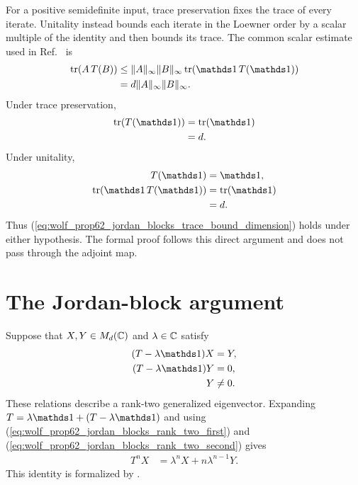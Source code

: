 \documentclass{article}
\begin{document}
For a positive semidefinite input, trace preservation fixes the trace of every
iterate. Unitality instead bounds each iterate in the Loewner order by a scalar
multiple of the identity and then bounds its trace. The common scalar estimate
used in Ref.~\cite{Wolf2012Quantum} is
\begin{align}
    \tr\!\left(A\,T(B)\right)
        &\leq \lVert A\rVert_\infty\lVert B\rVert_\infty
            \tr\!\left(\Id\,T(\Id)\right)
    \label{eq:wolf_prop62_jordan_blocks_trace_bound_first}\\
        &=d\lVert A\rVert_\infty\lVert B\rVert_\infty.
    \label{eq:wolf_prop62_jordan_blocks_trace_bound_dimension}
\end{align}
Under trace preservation,
\begin{align}
    \tr\!\left(T(\Id)\right)
        &=\tr(\Id)
    \label{eq:wolf_prop62_jordan_blocks_trace_preserving_identity}\\
        &=d.
    \label{eq:wolf_prop62_jordan_blocks_trace_preserving_dimension}
\end{align}
Under unitality,
\begin{align}
    T(\Id)&=\Id,
    \label{eq:wolf_prop62_jordan_blocks_unital_identity}\\
    \tr\!\left(\Id\,T(\Id)\right)
        &=\tr(\Id)
    \label{eq:wolf_prop62_jordan_blocks_unital_trace}\\
        &=d.
    \label{eq:wolf_prop62_jordan_blocks_unital_dimension}
\end{align}
Thus (\ref{eq:wolf_prop62_jordan_blocks_trace_bound_dimension}) holds under
either hypothesis. The formal proof follows this direct argument and does not
pass through the adjoint map.

\section{The Jordan-block argument}

Suppose that $X,Y\in M_{d}(\mathbb{C})$ and $\lambda\in\mathbb{C}$ satisfy
\begin{align}
    (T-\lambda\Id)X&=Y,
    \label{eq:wolf_prop62_jordan_blocks_rank_two_first}\\
    (T-\lambda\Id)Y&=0,
    \label{eq:wolf_prop62_jordan_blocks_rank_two_second}\\
    Y&\neq0.
    \label{eq:wolf_prop62_jordan_blocks_rank_two_nonzero}
\end{align}
These relations describe a rank-two generalized eigenvector. Expanding
$T=\lambda\Id+(T-\lambda\Id)$ and using
(\ref{eq:wolf_prop62_jordan_blocks_rank_two_first}) and
(\ref{eq:wolf_prop62_jordan_blocks_rank_two_second}) gives
\begin{align}
    T^nX
        &=\lambda^nX+n\lambda^{n-1}Y.
    \label{eq:wolf_prop62_jordan_blocks_iterate_formula}
\end{align}
This identity is formalized by
.
\end{document}
